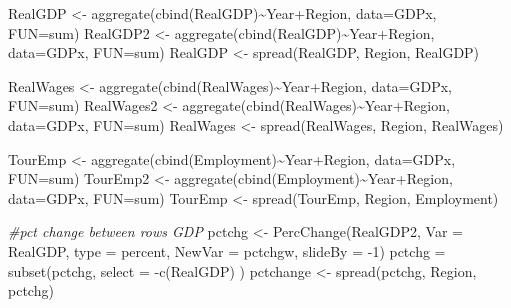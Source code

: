 \documentclass[
]{book}
\newenvironment{Shaded}{\begin{snugshade}}{\end{snugshade}}
\newcommand{\AttributeTok}[1]{\textcolor[rgb]{0.77,0.63,0.00}{#1}}
\newcommand{\CommentTok}[1]{\textcolor[rgb]{0.56,0.35,0.01}{\textit{#1}}}
\newcommand{\DecValTok}[1]{\textcolor[rgb]{0.00,0.00,0.81}{#1}}
\newcommand{\FunctionTok}[1]{\textcolor[rgb]{0.00,0.00,0.00}{#1}}
\newcommand{\NormalTok}[1]{#1}
\newcommand{\OtherTok}[1]{\textcolor[rgb]{0.56,0.35,0.01}{#1}}
\newcommand{\SpecialCharTok}[1]{\textcolor[rgb]{0.00,0.00,0.00}{#1}}
\newcommand{\StringTok}[1]{\textcolor[rgb]{0.31,0.60,0.02}{#1}}
\begin{document}
\begin{Shaded}
\begin{Highlighting}[]
\NormalTok{RealGDP }\OtherTok{\textless{}{-}} \FunctionTok{aggregate}\NormalTok{(}\FunctionTok{cbind}\NormalTok{(RealGDP)}\SpecialCharTok{\textasciitilde{}}\NormalTok{Year}\SpecialCharTok{+}\NormalTok{Region, }\AttributeTok{data=}\NormalTok{GDPx, }\AttributeTok{FUN=}\NormalTok{sum)}
\NormalTok{RealGDP2 }\OtherTok{\textless{}{-}} \FunctionTok{aggregate}\NormalTok{(}\FunctionTok{cbind}\NormalTok{(RealGDP)}\SpecialCharTok{\textasciitilde{}}\NormalTok{Year}\SpecialCharTok{+}\NormalTok{Region, }\AttributeTok{data=}\NormalTok{GDPx, }\AttributeTok{FUN=}\NormalTok{sum)}
\NormalTok{RealGDP }\OtherTok{\textless{}{-}} \FunctionTok{spread}\NormalTok{(RealGDP, Region, RealGDP)}

\NormalTok{RealWages }\OtherTok{\textless{}{-}} \FunctionTok{aggregate}\NormalTok{(}\FunctionTok{cbind}\NormalTok{(RealWages)}\SpecialCharTok{\textasciitilde{}}\NormalTok{Year}\SpecialCharTok{+}\NormalTok{Region, }\AttributeTok{data=}\NormalTok{GDPx, }\AttributeTok{FUN=}\NormalTok{sum)}
\NormalTok{RealWages2 }\OtherTok{\textless{}{-}} \FunctionTok{aggregate}\NormalTok{(}\FunctionTok{cbind}\NormalTok{(RealWages)}\SpecialCharTok{\textasciitilde{}}\NormalTok{Year}\SpecialCharTok{+}\NormalTok{Region, }\AttributeTok{data=}\NormalTok{GDPx, }\AttributeTok{FUN=}\NormalTok{sum)}
\NormalTok{RealWages }\OtherTok{\textless{}{-}} \FunctionTok{spread}\NormalTok{(RealWages, Region, RealWages)}

\NormalTok{TourEmp }\OtherTok{\textless{}{-}} \FunctionTok{aggregate}\NormalTok{(}\FunctionTok{cbind}\NormalTok{(Employment)}\SpecialCharTok{\textasciitilde{}}\NormalTok{Year}\SpecialCharTok{+}\NormalTok{Region, }\AttributeTok{data=}\NormalTok{GDPx, }\AttributeTok{FUN=}\NormalTok{sum)}
\NormalTok{TourEmp2 }\OtherTok{\textless{}{-}} \FunctionTok{aggregate}\NormalTok{(}\FunctionTok{cbind}\NormalTok{(Employment)}\SpecialCharTok{\textasciitilde{}}\NormalTok{Year}\SpecialCharTok{+}\NormalTok{Region, }\AttributeTok{data=}\NormalTok{GDPx, }\AttributeTok{FUN=}\NormalTok{sum)}
\NormalTok{TourEmp }\OtherTok{\textless{}{-}} \FunctionTok{spread}\NormalTok{(TourEmp, Region, Employment)}

\CommentTok{\#pct change between rows GDP}
\NormalTok{pctchg }\OtherTok{\textless{}{-}} \FunctionTok{PercChange}\NormalTok{(RealGDP2, }\AttributeTok{Var =} \StringTok{\textquotesingle{}RealGDP\textquotesingle{}}\NormalTok{,}
                     \AttributeTok{type =} \StringTok{\textquotesingle{}percent\textquotesingle{}}\NormalTok{,}
                     \AttributeTok{NewVar =} \StringTok{\textquotesingle{}pctchgw\textquotesingle{}}\NormalTok{,}
                     \AttributeTok{slideBy =} \SpecialCharTok{{-}}\DecValTok{1}\NormalTok{)}
\NormalTok{pctchg }\OtherTok{=} \FunctionTok{subset}\NormalTok{(pctchg, }\AttributeTok{select =} \SpecialCharTok{{-}}\FunctionTok{c}\NormalTok{(RealGDP) )}
\NormalTok{pctchange }\OtherTok{\textless{}{-}} \FunctionTok{spread}\NormalTok{(pctchg, Region, pctchg)}


\end{Highlighting}
\end{Shaded}
\end{document}
